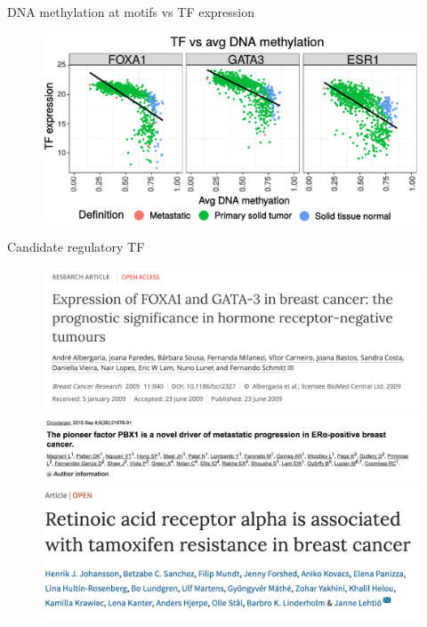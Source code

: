\documentclass[slidestop,compress,11pt,xcolor=dvipsnames]{beamer}
\begin{document}
\begin{frame}{DNA methylation at motifs vs TF expression}
 \begin{figure}
  \centering
  \includegraphics[width=1.0\linewidth]{ELMER/BRCA_TF_scatter.pdf}
 \end{figure}
\end{frame}


\begin{frame}{Candidate regulatory TF}
 \vspace*{-0.3cm}
 \begin{figure}
  \centering
  \includegraphics[width=0.8\linewidth]{ELMER/paper4.png}\\
  \includegraphics[width=0.8\linewidth]{ELMER/paper1.png}\\
  \includegraphics[width=0.8\linewidth]{ELMER/paper2.png}
 \end{figure}
\end{frame}
\end{document}
